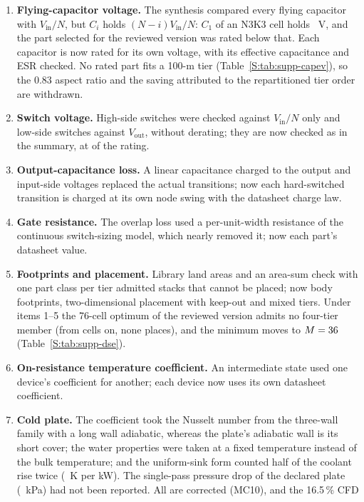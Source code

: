 \documentclass[10pt]{article}
\begin{document}
\begin{enumerate}
\item \textbf{Flying-capacitor voltage.} The synthesis compared every flying capacitor with
$V_{\mathrm{in}}/N$, but $C_i$ holds $(N-i)V_{\mathrm{in}}/N$: $C_1$ of an N3K3 cell holds
\FrConvCapVone~V, and the part selected for the reviewed version was rated below that. Each capacitor
is now rated for its own voltage, with its effective capacitance and ESR checked. No rated part fits a
100-\textmu m tier (Table~\ref{S:tab:supp-capev}), so the 0.83 aspect ratio and the saving attributed
to the repartitioned tier order are withdrawn.
\item \textbf{Switch voltage.} High-side switches were checked against $V_{\mathrm{in}}/N$ only and
low-side switches against $V_{\mathrm{out}}$, without derating; they are now checked as in the
summary, at \FrConvSwDerate{} of the rating.
\item \textbf{Output-capacitance loss.} A linear capacitance charged to the output and input-side
voltages replaced the actual transitions; now each hard-switched transition is charged at its own node
swing with the datasheet charge law.
\item \textbf{Gate resistance.} The overlap loss used a per-unit-width resistance of the continuous
switch-sizing model, which nearly removed it; now each part's datasheet value.
\item \textbf{Footprints and placement.} Library land areas and an area-sum check with one part class
per tier admitted stacks that cannot be placed; now body footprints, two-dimensional placement with
keep-out and mixed tiers. Under items 1--5 the 76-cell optimum of the reviewed version admits no
four-tier member (from \FrDseInfeasLo{} cells on, none places), and the minimum moves to $M =
36$ (Table~\ref{S:tab:supp-dse}).
\item \textbf{On-resistance temperature coefficient.} An intermediate state used one device's
coefficient for another; each device now uses its own datasheet coefficient.
\item \textbf{Cold plate.} The coefficient took the Nusselt number from the three-wall family with a
long wall adiabatic, whereas the plate's adiabatic wall is its short cover; the water properties were
taken at a fixed temperature instead of the bulk temperature; and the uniform-sink form counted half of
the coolant rise twice (\CoolCalK~K per kW). The single-pass pressure drop of the declared plate
(\CoolDpSinglePass~kPa) had not been reported. All are corrected (MC10), and the 16.5\,\% CFD

\end{enumerate}
\end{document}
